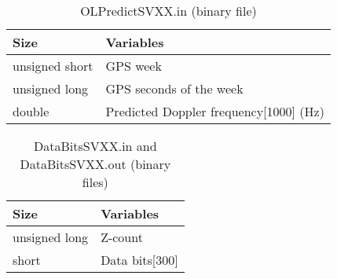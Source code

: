 \documentclass[12pt,letterpaper,oneside]{report}
\begin{document}
\begin{table}[H]
\caption{OLPredictSVXX.in  (binary file)}
\centering
\begin{tabular}{l l}
\hline\hline
Size&Variables \\[0.5ex]
\hline
unsigned short&GPS week\\
unsigned long&GPS seconds of the week\\
double&Predicted Doppler frequency[1000] (Hz)\\
\hline
\end{tabular}
\label{tab:OLpredictIN}
\end{table}

\begin{table}[H]
\caption{DataBitsSVXX.in and DataBitsSVXX.out (binary files)}
\centering
\begin{tabular}{l l}
\hline\hline
Size&Variables \\[0.5ex]
\hline
unsigned long&Z-count\\
short&Data bits[300] \\
\hline
\end{tabular}
\label{tab:databits}
\end{table}
\end{document}
